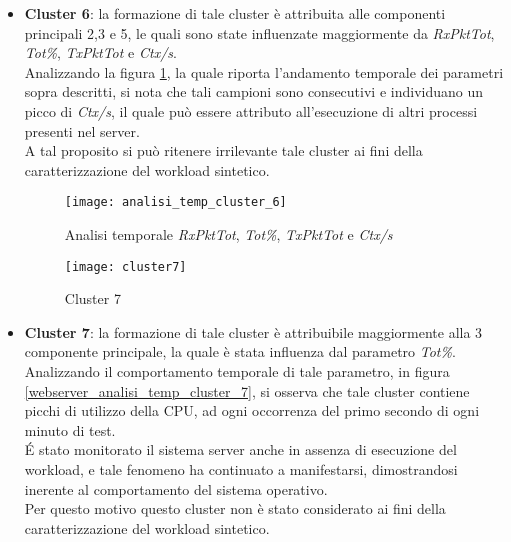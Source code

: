 \begin{itemize}
  \item \textbf{Cluster 6}: la formazione di tale cluster è attribuita alle
  componenti principali 2,3 e 5, le quali sono state influenzate maggiormente
  da \textit{RxPktTot}, \textit{Tot\%}, \textit{TxPktTot} e \textit{Ctx/s}.\\
  Analizzando la figura \ref{webserver_analisi_temp_cluster_6}, la quale riporta l'andamento
  temporale dei parametri sopra descritti, si nota che tali campioni sono consecutivi
  e individuano un picco di \textit{Ctx/s}, il quale può essere attributo all'esecuzione
  di altri processi presenti nel server.\\
  A tal proposito si può ritenere irrilevante tale cluster ai fini della
  caratterizzazione del workload sintetico.\\

  \begin{figure}[!htbp]
    \centering
    \texttt{[image: analisi\_temp\_cluster\_6]}
    \caption{Analisi temporale \textit{RxPktTot}, \textit{Tot\%}, \textit{TxPktTot} e \textit{Ctx/s}}
    \label{webserver_analisi_temp_cluster_6}
  \end{figure}

  \clearpage

  \begin{figure}[!htbp]
    \centering
    \texttt{[image: cluster7]}
    \caption{Cluster 7}
    \label{webserver_cluster7}
  \end{figure}

  \item \textbf{Cluster 7}: la formazione di tale cluster è attribuibile maggiormente
  alla 3 componente principale, la quale è stata influenza dal parametro \textit{Tot\%}.\\
  Analizzando il comportamento temporale di tale parametro, in figura \ref{webserver_analisi_temp_cluster_7},
  si osserva che tale cluster contiene picchi di utilizzo della CPU, ad ogni
  occorrenza del primo secondo di ogni minuto di test.\\
  \'E stato monitorato il sistema server anche in assenza di esecuzione del workload,
  e tale fenomeno ha continuato a manifestarsi, dimostrandosi inerente al
  comportamento del sistema operativo.\\
  Per questo motivo questo cluster non è stato considerato ai fini della
  caratterizzazione del workload sintetico.\\


\end{itemize}
